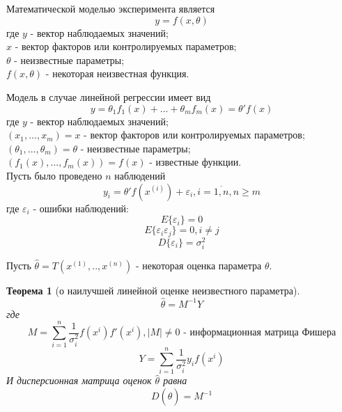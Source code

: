 	Математической моделью эксперимента является
	\begin{equation*}
		y = f(x, \theta)  
	\end{equation*}
	где $y$ - вектор наблюдаемых значений;\\
	$x$ - вектор факторов или контролируемых параметров;\\
	$\theta$ - неизвестные параметры;\\
	$f(x, \theta)$ - некоторая неизвестная функция.
	
	Модель в случае линейной регрессии имеет вид
	\begin{equation*}
		y = \theta_1 f_1(x) +...+ \theta_m f_m(x) = \theta'f(x)
	\end{equation*}
	где $y$ -  вектор наблюдаемых значений;\\
		$(x_1,...,x_m)=x$ - вектор факторов или контролируемых параметров;\\
		$(\theta_1,...,\theta_m)=\theta$ - неизвестные параметры;\\
		$(f_1(x),...,f_m(x))=f(x)$ - известные функции.\\
	
	Пусть было проведено $n$ наблюдений
	\begin{equation}
		y_i = \theta' f(x^{(i)}) + \varepsilon_i, i = \overline{1, n}, n \ge m
	\end{equation}
	где $\varepsilon_i$ - ошибки наблюдений:
		$$E\{\varepsilon_i\} = 0$$
		$$E\{\varepsilon_i \varepsilon_j\} = 0, i \ne j$$
		$$D\{\varepsilon_i\}=\sigma_i ^2$$
	
	Пусть $\hat{\theta} =T(x^{(1)},..,x^{(n)}) $ - некоторая оценка параметра $\theta$.\\
	
	
	\newtheorem{theorem}{Теорема}
	
	\begin{theorem}[о наилучшей линейной оценке неизвестного параметра]
		\begin{equation}
			\hat{\theta} = M^{-1} Y
		\end{equation}
		где 
		$$M = \sum_{i=1}^{n} \frac{1}{\sigma_i^2}f(x^{i})f'(x^{i}), |M| \ne 0 \text{ - информационная матрица Фишера}$$
		$$Y = \sum_{i=1}^{n}\frac{1}{\sigma_i^2} y_i f(x^{i})$$
		И дисперсионная матрица оценок $\hat \theta$ равна
			\begin{equation}D(\hat \theta)  = M^{-1}\end{equation}
	\end{theorem}
	
